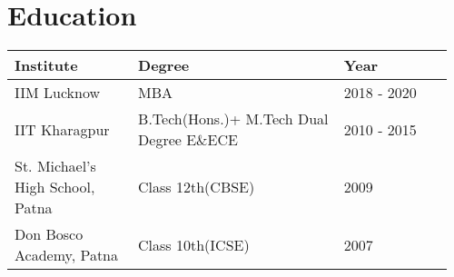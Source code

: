 \section{Education}
\vspace{-12pt}

\begin{table}[htbp]
    \centering
    \renewcommand{\arraystretch}{.85} %
    \setlength{\arrayrulewidth}{.7pt} %
    \begin{tabularx}{.97\textwidth}{|>{\centering\arraybackslash}p{0.27\linewidth}|>{\centering\arraybackslash}p{0.45\linewidth}|>{\centering\arraybackslash}p{0.245\linewidth}|}
        \hline
        \rowcolor[gray]{0.9}
        \small Institute & \small Degree & \small Year \\
        \hline
        \small IIM Lucknow & \small MBA & \small 2018 - 2020 \\
        \hline
        \small IIT Kharagpur & \small B.Tech(Hons.)+ M.Tech Dual Degree E\&ECE & \small 2010 - 2015 \\
        \hline
        \small St. Michael’s High School, Patna & Class 12th(CBSE) & \small 2009 \\
        \hline
        \small Don Bosco Academy, Patna & \small Class 10th(ICSE) & \small 2007 \\
        \hline
    \end{tabularx}
\end{table}
\vspace{-12pt}